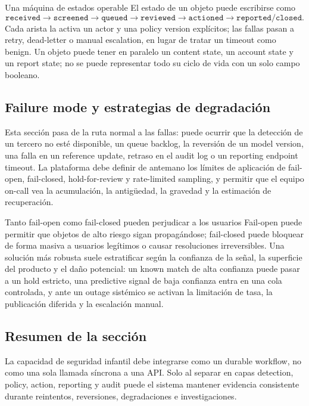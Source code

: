 \begin{importantbox}{Una máquina de estados operable}
El estado de un objeto puede escribirse como
\[
\texttt{received}\rightarrow\texttt{screened}\rightarrow
\texttt{queued}\rightarrow\texttt{reviewed}\rightarrow
\texttt{actioned}\rightarrow\texttt{reported/closed}.
\]
Cada arista la activa un actor y una policy version explícitos; las fallas pasan a retry, dead-letter o manual escalation, en lugar de tratar un timeout como benign. Un objeto puede tener en paralelo un content state, un account state y un report state; no se puede representar todo su ciclo de vida con un solo campo booleano.
\end{importantbox}

\subsection{Failure mode y estrategias de degradación}

Esta sección pasa de la ruta normal a las fallas: puede ocurrir que la detección de un tercero no esté disponible, un queue backlog, la reversión de un model version, una falla en un reference update, retraso en el audit log o un reporting endpoint timeout. La plataforma debe definir de antemano los límites de aplicación de fail-open, fail-closed, hold-for-review y rate-limited sampling, y permitir que el equipo on-call vea la acumulación, la antigüedad, la gravedad y la estimación de recuperación.

\begin{warningbox}{Tanto fail-open como fail-closed pueden perjudicar a los usuarios}
Fail-open puede permitir que objetos de alto riesgo sigan propagándose; fail-closed puede bloquear de forma masiva a usuarios legítimos o causar resoluciones irreversibles. Una solución más robusta suele estratificar según la confianza de la señal, la superficie del producto y el daño potencial: un known match de alta confianza puede pasar a un hold estricto, una predictive signal de baja confianza entra en una cola controlada, y ante un outage sistémico se activan la limitación de tasa, la publicación diferida y la escalación manual.
\end{warningbox}


\subsection{Resumen de la sección}

La capacidad de seguridad infantil debe integrarse como un durable workflow, no como una sola llamada síncrona a una API. Solo al separar en capas detection, policy, action, reporting y audit puede el sistema mantener evidencia consistente durante reintentos, reversiones, degradaciones e investigaciones.
